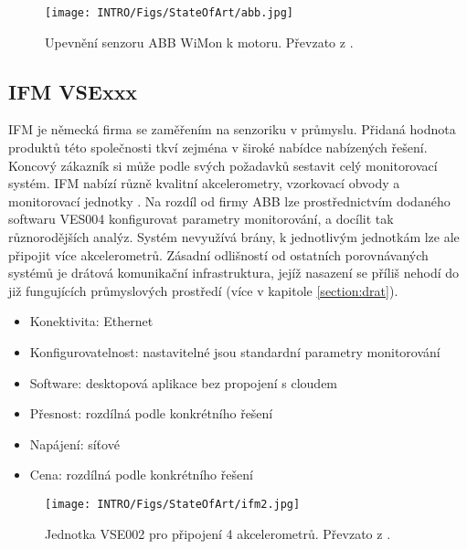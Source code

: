         \begin{figure} [!h]
            \centering
            \caption{Upevnění senzoru ABB WiMon k motoru. Převzato z \cite{manufactor:1}.}
            \texttt{[image: INTRO/Figs/StateOfArt/abb.jpg]}
        \end{figure} 
        
    \subsection{IFM VSExxx}
        IFM je německá firma se zaměřením na senzoriku v průmyslu. Přidaná hodnota produktů této společnosti tkví zejména v široké nabídce nabízených řešení. Koncový zákazník si může podle svých požadavků sestavit celý monitorovací systém. IFM nabízí různě kvalitní akcelerometry, vzorkovací obvody a monitorovací jednotky \cite{manufactor:2}. Na rozdíl od firmy ABB lze prostřednictvím dodaného softwaru VES004 konfigurovat parametry monitorování, a docílit tak různorodějších analýz. Systém nevyužívá brány, k jednotlivým jednotkám lze ale připojit více akcelerometrů. Zásadní odlišností od ostatních porovnávaných systémů je drátová komunikační infrastruktura, jejíž nasazení se příliš nehodí do již fungujících průmyslových prostředí (více v kapitole \ref{section:drat}).
        
         \begin{itemize}
            \item Konektivita: Ethernet
            \item Konfigurovatelnost: nastavitelné jsou standardní parametry monitorování
            \item Software: desktopová aplikace bez propojení s cloudem
            \item Přesnost: rozdílná podle konkrétního řešení
            \item Napájení: síťové 
            \item Cena: rozdílná podle konkrétního řešení
        \end{itemize}{}
        
        \begin{figure}[!htp]
            \centering
            \texttt{[image: INTRO/Figs/StateOfArt/ifm2.jpg]}
            \caption {Jednotka VSE002 pro připojení 4 akcelerometrů. Převzato z \cite{manufactor:2}.}
        \end{figure}
        
       
        
